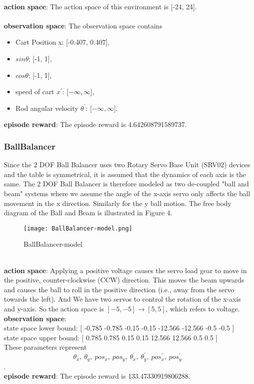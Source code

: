 \documentclass[12pt]{article}
\begin{document}
~\\\textbf{action space}: The action space of this environment is [-24, 24].\\
\\\textbf{observation space}: The observation space contains 
\begin{itemize}
  \item Cart Position x: [-0.407, 0.407], 
  \item $sin\theta$: [-1, 1], 
  \item $cos\theta$: [-1, 1], 
  \item speed of cart $x^\prime$: [$-\infty, \infty$], 
  \item Rod angular velocity $\theta^\prime$: [$-\infty, \infty$].
\end{itemize}
\textbf{episode reward}: The episode reward is 4.642608791589737.

\subsubsection{BallBalancer}
Since the 2 DOF Ball Balancer uses two Rotary Servo Base Unit (SRV02) devices and the table is symmetrical,
it is assumed that the dynamics of each axis is the same. The 2 DOF Ball Balancer is therefore modeled as two
de-coupled "ball and beam" systems where we assume the angle of the x-axis servo only affects the ball movement
in the x direction. Similarly for the y ball motion. The free body diagram of the Ball and Beam is illustrated in Figure 4.
\begin{figure}[H]
  \centering
  \texttt{[image: BallBalancer-model.png]}
  \caption{BallBalancer-model}
\end{figure}
~\\\textbf{action space}: Applying a positive voltage causes the servo load gear to move in the positive, counter-clockwise (CCW)
direction. This moves the beam upwards and causes the ball to roll in the positive direction (i.e., away from
the servo towards the left). And We have two servos to control the rotation of the x-axis and y-axis. So the action space is $[-5,-5] \rightarrow [5,5]$, which refers to voltage.\\
\textbf{observation space}: \\
state space lower bound:  [ -0.785  -0.785  -0.15   -0.15  -12.566 -12.566  -0.5    -0.5  ]\\
state space upper bound:  [ 0.785  0.785  0.15   0.15  12.566 12.566  0.5    0.5  ]\\
These parameters represent $$\theta_x,\ \theta_y,\ pos_x,\ pos_y,\ \theta_x^\prime,\ \theta_y^\prime,\ pos_x^\prime,\ pos_y^\prime$$.\\
\textbf{episode reward}: The episode reward is 133.47330919806288.
\end{document}
